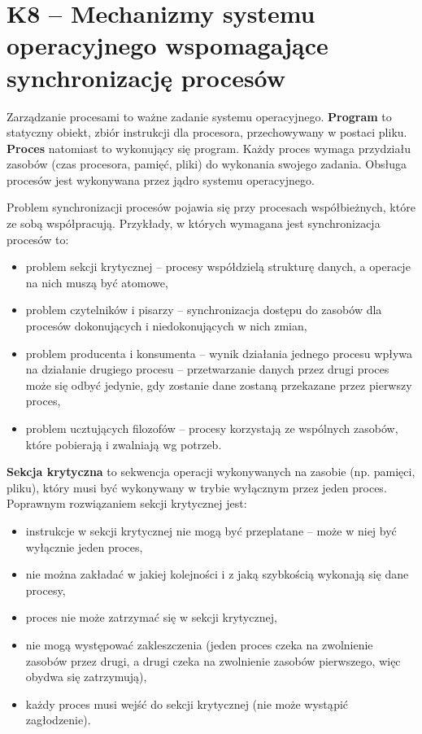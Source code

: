 \sloppy\section{K8 -- Mechanizmy systemu operacyjnego wspomagające synchronizację procesów}

Zarządzanie procesami to ważne zadanie systemu operacyjnego. \textbf{Program} to statyczny obiekt, zbiór instrukcji dla procesora, przechowywany w postaci pliku. \textbf{Proces} natomiast to wykonujący się program. Każdy proces wymaga przydziału zasobów (czas procesora, pamięć, pliki) do wykonania swojego zadania. Obsługa procesów jest wykonywana przez jądro systemu operacyjnego.

Problem synchronizacji procesów pojawia się przy procesach współbieżnych, które ze sobą współpracują. Przykłady, w których wymagana jest synchronizacja procesów to:
\begin{itemize}
\item problem sekcji krytycznej -- procesy współdzielą strukturę danych, a operacje na nich muszą być atomowe,
\item problem czytelników i pisarzy -- synchronizacja dostępu do zasobów dla procesów dokonujących i niedokonujących w nich zmian,
\item problem producenta i konsumenta -- wynik działania jednego procesu wpływa na działanie drugiego procesu -- przetwarzanie danych przez drugi proces może się odbyć jedynie, gdy zostanie dane zostaną przekazane przez pierwszy proces,
\item problem ucztujących filozofów -- procesy korzystają ze wspólnych zasobów, które pobierają i zwalniają wg potrzeb.
\end{itemize}

\textbf{Sekcja krytyczna} to sekwencja operacji wykonywanych na zasobie (np. pamięci, pliku), który musi być wykonywany w trybie wyłącznym przez jeden proces. Poprawnym rozwiązaniem sekcji krytycznej jest:
\begin{itemize}
\item instrukcje w sekcji krytycznej nie mogą być przeplatane -- może w niej być wyłącznie jeden proces,
\item nie można zakładać w jakiej kolejności i z jaką szybkością wykonają się dane procesy,
\item proces nie może zatrzymać się w sekcji krytycznej,
\item nie mogą występować zakleszczenia (jeden proces czeka na zwolnienie zasobów przez drugi, a drugi czeka na zwolnienie zasobów pierwszego, więc obydwa się zatrzymują),
\item każdy proces musi wejść do sekcji krytycznej (nie może wystąpić zagłodzenie).
\end{itemize}

